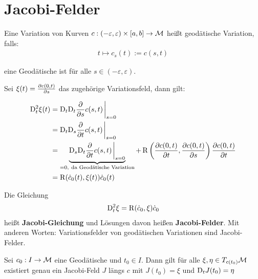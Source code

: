 \section{Jacobi-Felder}

\begin{defs}
Eine Variation von Kurven 
$c: (-\varepsilon, \varepsilon) \times [a , b] \to \mathcal{M}$
heißt geodätische Variation, falls:
\begin{align*}
    t \mapsto c_s(t) := c(s, t)
\end{align*}

eine Geodätische ist für alle $s\in (-\varepsilon, \varepsilon)$.
\end{defs}

Sei $\xi (t) = \pdv{c(0,t)}{s}$ das zugehörige Variationsfeld, dann gilt:

\begin{align*}
\covd^2_t \xi (t) &= \covd_t \covd_t \pdv{s} c(s, t) \eval_{s=0}\\
&= \covd_t \covd_s \pdv{t} c(s, t) \eval_{s=0}\\
&= \underbrace{\covd_s \covd_t \pdv{t} c(s, t) \eval_{s=0}}_{=0, \ \text{da Geodätische Variation}} + 
\curv \left( \pdv{c(0, t)}{t} , \pdv{c(0, t)}{s}\right) \pdv{c(0,t)}{t}\\
&= \curv ( \dot{c}_0 (t) , \xi (t)) \dot{c}_0 (t)
\end{align*}

\begin{defs}
Die Gleichung
\begin{align}
\mathrm{D}^2_t \xi = \operatorname{R} (\dot{c}_0 , \xi ) \dot{c}_0
\end{align}
heißt \textbf{Jacobi-Gleichung} und Lösungen davon heißen
\textbf{Jacobi-Felder}.
Mit anderen Worten: Variationsfelder von geodätischen Variationen sind Jacobi-Felder.
\end{defs}

\begin{satz}
\label{satz:eindeutigkeitjacobi}
Sei $c_0 : I \to \mathcal{M}$ eine Geodätische und $t_0 \in I$.
Dann gilt für alle $\xi, \eta \in T_{c(t_0)}\mathcal{M}$ existiert genau ein Jacobi-Feld $J$ 
längs $c$ mit $J(t_0) = \xi$ und $\mathrm{D}_t J (t_0) = \eta$
\end{satz}

